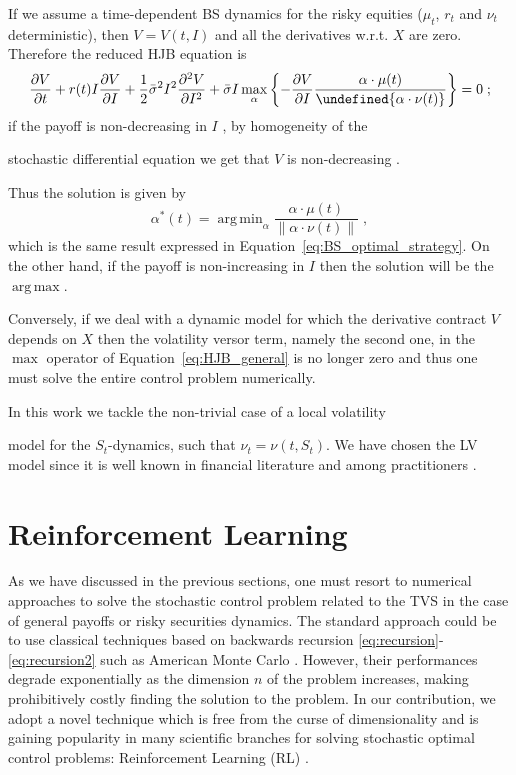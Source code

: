 \documentclass[runningheads]{m2ef}
\DeclareMathOperator*{\argmax}{arg\,max}
\DeclareMathOperator*{\argmin}{arg\,min}
\let\norm\undefined %
\DeclarePairedDelimiter\norm{\lVert}{\rVert}
\newcommand\soutpars[1]{\let\helpcmd\sout\parhelp#1\par\relax\relax}
\newcommand{\change}[1]{{\color{red} {#1}}}%
\newcommand{\remove}[1]{{\color{red} \soutpars{{#1}}}}%
\begin{document}
If we assume a time-dependent BS dynamics for the risky equities ($\mu_t$, $r_t$ and $\nu_t$ deterministic), then $V = V(t,I)$ and all the derivatives w.r.t. $X$ are zero. Therefore the reduced HJB equation is
\begin{equation}
	\frac{\partial V}{\partial t} +  r(t) I \frac{\partial V}{\partial I}  + \frac{1}{2}\bar{\sigma}^2I^2\frac{\partial^2V}{\partial I^2} + \bar{\sigma}I\max_\alpha \left\{ -\frac{\partial V}{\partial I}   \frac{\alpha \cdot \mu(t)}{\norm{\alpha \cdot \nu(t)}}\right\} = 0 \; ;
\end{equation}
if the payoff is non-decreasing in $I$\change{,} by homogeneity of the \remove{SDE} \change{stochastic differential equation} we get that $V$ is non-decreasing\change{.}\remove{; t}\change{T}hus the solution is given by
\begin{equation}
 \alpha^*(t) = \argmin_\alpha \frac{\alpha \cdot \mu(t)}{\|\alpha \cdot \nu(t)\|} \; ,
	\end{equation}
which is the same result expressed in Equation~\eqref{eq:BS_optimal_strategy}. On the other hand, if the payoff is non-increasing in $I$ then the solution will be the $\argmax$.

Conversely, if we deal with a dynamic model for which the derivative contract $V$ depends on $X$ then the volatility versor term, namely the second one, in the $\max$ operator of Equation~\eqref{eq:HJB_general} is no longer zero and thus one must solve the entire control problem numerically. 

In this work we tackle the non-trivial case of a local volatility \remove{(LV)} model for the $S_t$-dynamics, such that $\nu_t = \nu(t,S_t)$. We have chosen the LV model since it is well known in financial literature and among practitioners \change{\cite{Gatheral2006}}.


\section{Reinforcement \change{L}earning}\label{sec:RL}
As we have discussed in the previous sections, one must resort to numerical approaches to solve the stochastic control problem related to the TVS in the case of general payoffs or risky securities dynamics. The standard approach could be to use classical techniques based on backwards recursion \eqref{eq:recursion}-\eqref{eq:recursion2} such as American Monte Carlo \cite{Longstaff2001}. However, their performances degrade exponentially as the dimension $n$ of the problem increases, making prohibitively costly finding the solution to the problem. In our contribution, we adopt a novel technique which is free from the curse of dimensionality and is gaining popularity in many scientific branches for solving stochastic optimal control problems: Reinforcement Learning (RL) \cite{Sutton2018}. 
\end{document}
